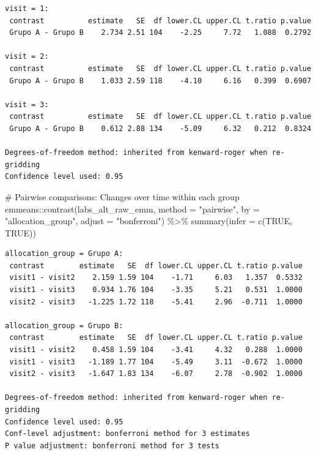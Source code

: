 \documentclass[
  letterpaper,
  DIV=11,
  numbers=noendperiod]{scrartcl}
\newenvironment{Shaded}{\begin{snugshade}}{\end{snugshade}}
\newcommand{\AttributeTok}[1]{\textcolor[rgb]{0.40,0.45,0.13}{#1}}
\newcommand{\CommentTok}[1]{\textcolor[rgb]{0.37,0.37,0.37}{#1}}
\newcommand{\ConstantTok}[1]{\textcolor[rgb]{0.56,0.35,0.01}{#1}}
\newcommand{\FunctionTok}[1]{\textcolor[rgb]{0.28,0.35,0.67}{#1}}
\newcommand{\NormalTok}[1]{\textcolor[rgb]{0.00,0.23,0.31}{#1}}
\newcommand{\SpecialCharTok}[1]{\textcolor[rgb]{0.37,0.37,0.37}{#1}}
\newcommand{\StringTok}[1]{\textcolor[rgb]{0.13,0.47,0.30}{#1}}
\begin{document}
\begin{verbatim}
visit = 1:
 contrast          estimate   SE  df lower.CL upper.CL t.ratio p.value
 Grupo A - Grupo B    2.734 2.51 104    -2.25     7.72   1.088  0.2792

visit = 2:
 contrast          estimate   SE  df lower.CL upper.CL t.ratio p.value
 Grupo A - Grupo B    1.033 2.59 118    -4.10     6.16   0.399  0.6907

visit = 3:
 contrast          estimate   SE  df lower.CL upper.CL t.ratio p.value
 Grupo A - Grupo B    0.612 2.88 134    -5.09     6.32   0.212  0.8324

Degrees-of-freedom method: inherited from kenward-roger when re-gridding 
Confidence level used: 0.95 
\end{verbatim}

\begin{Shaded}
\begin{Highlighting}[]
\CommentTok{\# Pairwise comparisons: Changes over time within each group}
\NormalTok{emmeans}\SpecialCharTok{::}\FunctionTok{contrast}\NormalTok{(labs\_alt\_raw\_emm, }\AttributeTok{method =} \StringTok{"pairwise"}\NormalTok{, }\AttributeTok{by =} \StringTok{"allocation\_group"}\NormalTok{, }\AttributeTok{adjust =} \StringTok{"bonferroni"}\NormalTok{) }\SpecialCharTok{\%\textgreater{}\%} \FunctionTok{summary}\NormalTok{(}\AttributeTok{infer =} \FunctionTok{c}\NormalTok{(}\ConstantTok{TRUE}\NormalTok{, }\ConstantTok{TRUE}\NormalTok{))}
\end{Highlighting}
\end{Shaded}

\begin{verbatim}
allocation_group = Grupo A:
 contrast        estimate   SE  df lower.CL upper.CL t.ratio p.value
 visit1 - visit2    2.159 1.59 104    -1.71     6.03   1.357  0.5332
 visit1 - visit3    0.934 1.76 104    -3.35     5.21   0.531  1.0000
 visit2 - visit3   -1.225 1.72 118    -5.41     2.96  -0.711  1.0000

allocation_group = Grupo B:
 contrast        estimate   SE  df lower.CL upper.CL t.ratio p.value
 visit1 - visit2    0.458 1.59 104    -3.41     4.32   0.288  1.0000
 visit1 - visit3   -1.189 1.77 104    -5.49     3.11  -0.672  1.0000
 visit2 - visit3   -1.647 1.83 134    -6.07     2.78  -0.902  1.0000

Degrees-of-freedom method: inherited from kenward-roger when re-gridding 
Confidence level used: 0.95 
Conf-level adjustment: bonferroni method for 3 estimates 
P value adjustment: bonferroni method for 3 tests 
\end{verbatim}
\end{document}

